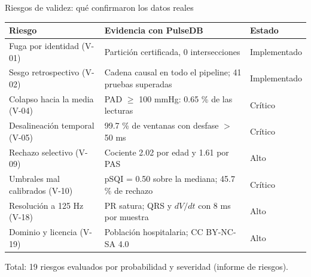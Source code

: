 \documentclass[aspectratio=169]{beamer}
\begin{document}
\begin{frame}{Riesgos de validez: qué confirmaron los datos reales}
  \centering
  \footnotesize
  \begin{tabular}{p{4.6cm}p{6.6cm}p{2.4cm}}
    \toprule
    Riesgo & Evidencia con PulseDB & Estado \\
    \midrule
    Fuga por identidad (V-01) & Partición certificada, 0 intersecciones & Implementado \\
    Sesgo retrospectivo (V-02) & Cadena causal en todo el pipeline; 41 pruebas superadas & Implementado \\
    Colapso hacia la media (V-04) & PAD $\ge$ 100 mmHg: 0.65 \% de las lecturas & \textcolor{aasimrojo}{Crítico} \\
    Desalineación temporal (V-05) & 99.7 \% de ventanas con desfase $>$ 50 ms & \textcolor{aasimrojo}{Crítico} \\
    Rechazo selectivo (V-09) & Cociente 2.02 por edad y 1.61 por PAS & \textcolor{aasimrojo}{Alto} \\
    Umbrales mal calibrados (V-10) & pSQI = 0.50 sobre la mediana; 45.7 \% de rechazo & \textcolor{aasimrojo}{Crítico} \\
    Resolución a 125 Hz (V-18) & PR satura; QRS y $dV/dt$ con 8 ms por muestra & Alto \\
    Dominio y licencia (V-19) & Población hospitalaria; CC BY-NC-SA 4.0 & Alto \\
    \bottomrule
  \end{tabular}

  \vspace{0.6em}
  Total: 19 riesgos evaluados por probabilidad y severidad (informe de riesgos).
\end{frame}
\end{document}
